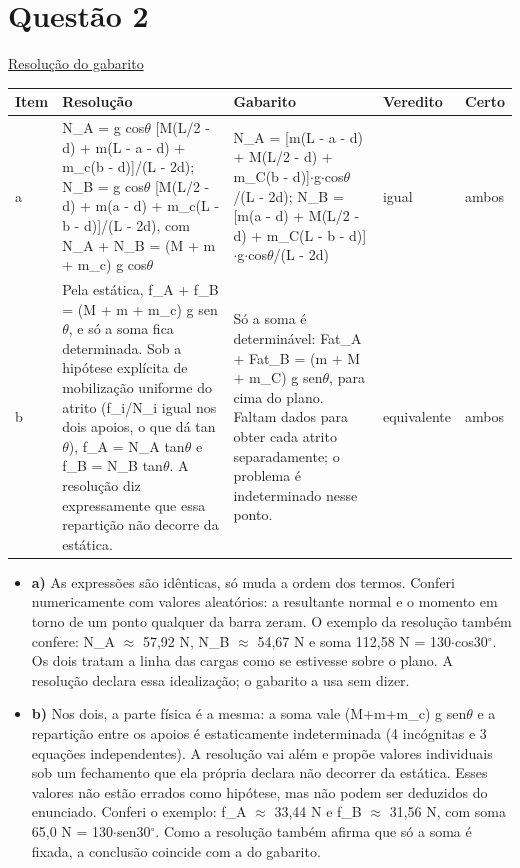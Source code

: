 \documentclass{article}%
\begin{document}
\section*{Questão 2}%
\href{https://poliedroresolve.sistemapoliedro.com.br/vestibulares/ita/2026/ita-2-fase-dia-3-30-10-2025-2-fase-dia-3/dissertativa-2-fisica-2-fase-dia-3-ita-2026}{Resolução do gabarito}\par\smallskip%
\begin{longtable}{@{}p{} p{} p{} p{} p{}@{}}\toprule Item & Resolução & Gabarito & Veredito & Certo \\ \midrule
a & N\_A = g cos$\theta$ {[}M(L/2 - d) + m(L - a - d) + m\_c(b - d){]}/(L - 2d); N\_B = g cos$\theta$ {[}M(L/2 - d) + m(a - d) + m\_c(L - b - d){]}/(L - 2d), com N\_A + N\_B = (M + m + m\_c) g cos$\theta$ & N\_A = {[}m(L - a - d) + M(L/2 - d) + m\_C(b - d){]}$\cdot$g$\cdot$cos$\theta$/(L - 2d); N\_B = {[}m(a - d) + M(L/2 - d) + m\_C(L - b - d){]}$\cdot$g$\cdot$cos$\theta$/(L - 2d) & igual & ambos \\
b & Pela estática, f\_A + f\_B = (M + m + m\_c) g sen$\theta$, e só a soma fica determinada. Sob a hipótese explícita de mobilização uniforme do atrito (f\_i/N\_i igual nos dois apoios, o que dá tan$\theta$), f\_A = N\_A tan$\theta$ e f\_B = N\_B tan$\theta$. A resolução diz expressamente que essa repartição não decorre da estática. & Só a soma é determinável: Fat\_A + Fat\_B = (m + M + m\_C) g sen$\theta$, para cima do plano. Faltam dados para obter cada atrito separadamente; o problema é indeterminado nesse ponto. & equivalente & ambos \\
\bottomrule\end{longtable}%
\begin{itemize}%
\item%
\textbf{a)} As expressões são idênticas, só muda a ordem dos termos. Conferi numericamente com valores aleatórios: a resultante normal e o momento em torno de um ponto qualquer da barra zeram. O exemplo da resolução também confere: N\_A $\approx$ 57,92 N, N\_B $\approx$ 54,67 N e soma 112,58 N = 130$\cdot$cos30$^\circ$. Os dois tratam a linha das cargas como se estivesse sobre o plano. A resolução declara essa idealização; o gabarito a usa sem dizer.%
\item%
\textbf{b)} Nos dois, a parte física é a mesma: a soma vale (M+m+m\_c) g sen$\theta$ e a repartição entre os apoios é estaticamente indeterminada (4 incógnitas e 3 equações independentes). A resolução vai além e propõe valores individuais sob um fechamento que ela própria declara não decorrer da estática. Esses valores não estão errados como hipótese, mas não podem ser deduzidos do enunciado. Conferi o exemplo: f\_A $\approx$ 33,44 N e f\_B $\approx$ 31,56 N, com soma 65,0 N = 130$\cdot$sen30$^\circ$. Como a resolução também afirma que só a soma é fixada, a conclusão coincide com a do gabarito.%
\end{itemize}%
\end{document}

